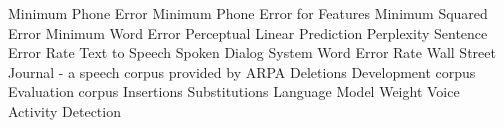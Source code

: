 \begin{acronym}[TDMA]
     {Minimum Phone Error}
     {Minimum Phone Error for Features}
     {Minimum Squared Error}
     {Minimum Word Error}
     {Perceptual Linear Prediction}
     {Perplexity}
     {Sentence Error Rate}
     {Text to Speech}
     {Spoken Dialog System}
     {Word Error Rate}
     {Wall Street Journal - a speech corpus provided by ARPA}
     {Deletions}
     {Development corpus}
     {Evaluation corpus}
     {Insertions}
     {Substitutions}
     {Language Model Weight}
     {Voice Activity Detection}
\end{acronym}

